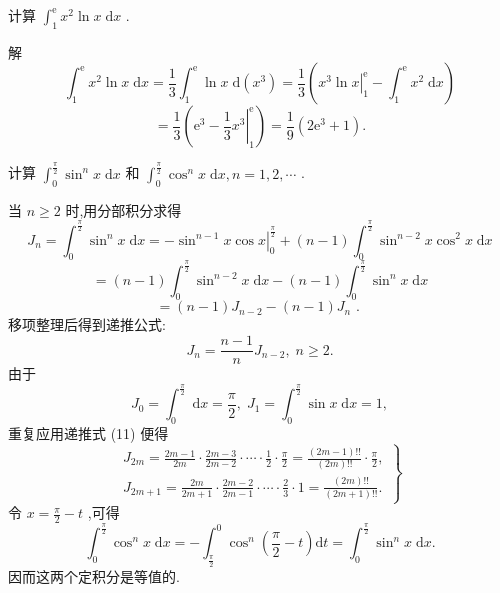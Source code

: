 \begin{example}

\end{example}
计算 \({\int }_{1}^{\mathrm{e}}{x}^{2}\ln x\mathrm{\;d}x\) .

解
\[
{\int }_{1}^{\mathrm{e}}{x}^{2}\ln x\mathrm{\;d}x = \frac{1}{3}{\int }_{1}^{\mathrm{e}}\ln x\mathrm{\;d}\left( {x}^{3}\right)  = \frac{1}{3}\left( {{\left. {x}^{3}\ln x\right| }_{1}^{\mathrm{e}} - {\int }_{1}^{\mathrm{e}}{x}^{2}\mathrm{\;d}x}\right)
\]
\[
= \frac{1}{3}\left( {{\mathrm{e}}^{3} - {\left. \frac{1}{3}{x}^{3}\right| }_{1}^{\mathrm{e}}}\right)  = \frac{1}{9}\left( {2{\mathrm{e}}^{3} + 1}\right) .
\]
\begin{example}

\end{example}
计算 \({\int }_{0}^{\frac{\pi }{2}}{\sin }^{n}x\mathrm{\;d}x\) 和 \({\int }_{0}^{\frac{\pi }{2}}{\cos }^{n}x\mathrm{\;d}x,n = 1,2,\cdots\) .

\begin{solution}

\end{solution}
当 \(n \geq  2\) 时,用分部积分求得
\[
{J}_{n} = {\int }_{0}^{\frac{\pi }{2}}{\sin }^{n}x\mathrm{\;d}x =  - {\left. {\sin }^{n - 1}x\cos x\right| }_{0}^{\frac{\pi }{2}} + \left( {n - 1}\right) {\int }_{0}^{\frac{\pi }{2}}{\sin }^{n - 2}x{\cos }^{2}x\mathrm{\;d}x
\]
\[
= \left( {n - 1}\right) {\int }_{0}^{\frac{\pi }{2}}{\sin }^{n - 2}x\mathrm{\;d}x - \left( {n - 1}\right) {\int }_{0}^{\frac{\pi }{2}}{\sin }^{n}x\mathrm{\;d}x
\]
\[
= \left( {n - 1}\right) {J}_{n - 2} - \left( {n - 1}\right) {J}_{n}\text{ . }
\]
移项整理后得到递推公式:
\[
{J}_{n} = \frac{n - 1}{n}{J}_{n - 2},\;n \geq  2. \tag{11}
\]
由于
\[
{J}_{0} = {\int }_{0}^{\frac{\pi }{2}}\mathrm{\;d}x = \frac{\pi }{2},\;{J}_{1} = {\int }_{0}^{\frac{\pi }{2}}\sin x\mathrm{\;d}x = 1,
\]
重复应用递推式 (11) 便得
\[
\left. \begin{array}{l} {J}_{2m} = \frac{{2m} - 1}{2m} \cdot  \frac{{2m} - 3}{{2m} - 2} \cdot  \cdots  \cdot  \frac{1}{2} \cdot  \frac{\pi }{2} = \frac{\left( {{2m} - 1}\right) !!}{\left( {2m}\right) !!} \cdot  \frac{\pi }{2}, \\  {J}_{{2m} + 1} = \frac{2m}{{2m} + 1} \cdot  \frac{{2m} - 2}{{2m} - 1} \cdot  \cdots  \cdot  \frac{2}{3} \cdot  1 = \frac{\left( {2m}\right) !!}{\left( {{2m} + 1}\right) !!}. \end{array}\right\}   \tag{12}
\]
令 \(x = \frac{\pi }{2} - t\) ,可得
\[
{\int }_{0}^{\frac{\pi }{2}}{\cos }^{n}x\mathrm{\;d}x =  - {\int }_{\frac{\pi }{2}}^{0}{\cos }^{n}\left( {\frac{\pi }{2} - t}\right) \mathrm{d}t = {\int }_{0}^{\frac{\pi }{2}}{\sin }^{n}x\mathrm{\;d}x.
\]
因而这两个定积分是等值的.

